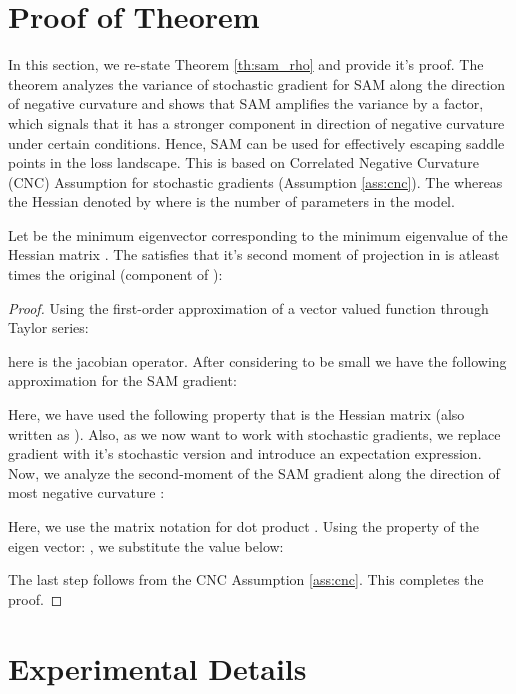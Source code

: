 \documentclass{article}
\begin{document}
\section{Proof of Theorem}
\label{app:proof_theorem}
In this section, we re-state Theorem \ref{th:sam_rho} and provide it's proof. The theorem analyzes the variance of stochastic gradient for SAM along the direction of negative curvature and shows that SAM amplifies the variance by a factor, which signals that it has a stronger component in direction of negative curvature under certain conditions. Hence, SAM can be used for effectively escaping saddle points in the loss landscape. This is based on Correlated Negative Curvature (CNC) Assumption for stochastic gradients (Assumption \ref{ass:cnc}). The 
 whereas the Hessian denoted by  where  is the number of parameters in the model.
\begin{theorem}
Let  be the minimum eigenvector corresponding to the minimum eigenvalue  of the Hessian matrix . The  satisfies that it's second moment of projection in  is atleast  times the original (component of ): 



\end{theorem}
\begin{proof}

Using the first-order approximation of a vector valued function through Taylor series:

here  is the jacobian operator. After considering  to be small we have the following approximation for the SAM gradient:

Here, we have used the following property that   is the Hessian matrix  (also written as ). Also, as we now want to work with stochastic gradients, we replace gradient  with it's stochastic version  and introduce an expectation expression.
Now, we analyze the second-moment of the SAM gradient along the direction of most negative curvature :

Here, we use the matrix notation for dot product . Using the property of the eigen vector: , we substitute the value below:

The last step follows from the CNC Assumption \ref{ass:cnc}. This completes the proof.
\end{proof}
\section{Experimental Details}
\label{app:experimental_details}
\end{document}
